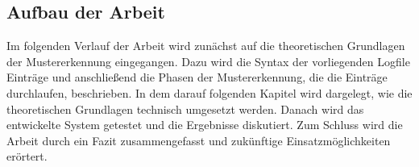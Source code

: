 \subsection{Aufbau der Arbeit}
\label{sub:Aufbau der Arbeit}
Im folgenden Verlauf der Arbeit wird zunächst auf die theoretischen Grundlagen der Mustererkennung eingegangen. Dazu wird die Syntax der vorliegenden Logfile Einträge und anschließend die Phasen der Mustererkennung, die die Einträge durchlaufen, beschrieben. In dem darauf folgenden Kapitel wird dargelegt, wie die theoretischen Grundlagen technisch umgesetzt werden. Danach wird das entwickelte System getestet und die Ergebnisse diskutiert. Zum Schluss wird die Arbeit durch ein Fazit zusammengefasst und zukünftige Einsatzmöglichkeiten erörtert.

\clearpage



